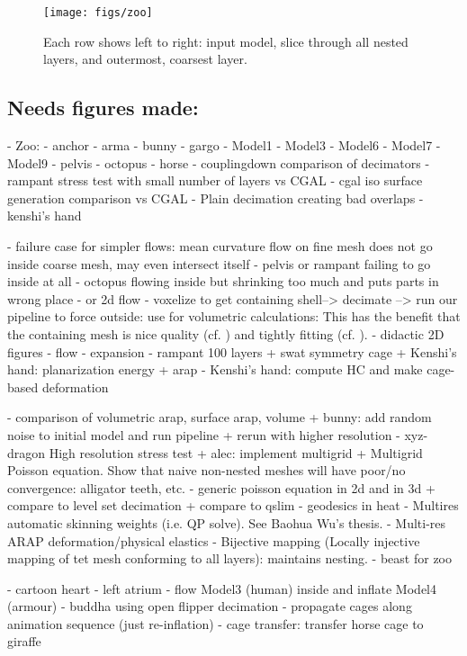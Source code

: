 


\begin{figure*}
  \texttt{[image: figs/zoo]}
  \caption{Each row shows left to right: input model, slice through all nested
  layers, and outermost, coarsest layer.}
  \label{fig:zoo}
\end{figure*}

\subsection{Needs figures made:}
- Zoo:
  - anchor
  - arma
  - bunny
  - gargo
  - Model1
  - Model3
  - Model6
  - Model7
  - Model9
  - pelvis
  - octopus
  - horse
- couplingdown comparison of decimators
- rampant stress test with small number of layers vs CGAL
- cgal iso surface generation comparison vs CGAL
- Plain decimation creating bad overlaps
- kenshi's hand


- failure case for simpler flows: mean curvature flow on fine mesh does not
  go inside coarse mesh, may even intersect itself
    - pelvis or rampant failing to go inside at all
    - octopus flowing inside but shrinking too much and puts parts in wrong
      place
    - or 2d flow
- voxelize to get containing shell--> decimate --> run our pipeline to force
  outside: use for volumetric calculations: This has the benefit that the
  containing mesh is nice quality (cf. \cite{Jacobson:WN:2013}) and tightly
  fitting (cf. \cite{Xu:2014:SDF}).
- didactic 2D figures
  - flow
  - expansion
- rampant 100 layers
+ swat symmetry cage
+ Kenshi's hand: planarization energy + arap
- Kenshi's hand: compute HC and make cage-based deformation

- comparison of volumetric arap, surface arap, volume
+ bunny: add random noise to initial model and run pipeline
  + rerun with higher resolution
- xyz-dragon High resolution stress test
+ alec: implement multigrid
  + Multigrid Poisson equation. Show that naive non-nested meshes will have
    poor/no convergence: alligator teeth, etc.
      - generic poisson equation in 2d and in 3d
        + compare to level set decimation
        + compare to qslim
      - geodesics in heat 
  - Multires automatic skinning weights (i.e. QP solve). See Baohua Wu's thesis.
  - Multi-res ARAP deformation/physical elastics
  - Bijective mapping (Locally injective mapping of tet mesh conforming to all
    layers): maintains nesting.
- beast for zoo

- cartoon heart
- left atrium
- flow Model3 (human) inside and inflate Model4 (armour)
- buddha using open flipper decimation
- propagate cages along animation sequence (just re-inflation)
- cage transfer: transfer horse cage to giraffe

